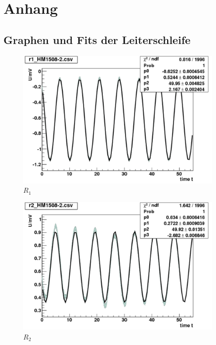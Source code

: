 \clearpage
\section{Anhang}

\begin{appendix}

\section{Graphen und Fits der Leiterschleife}

\begin{figure}[H]
	\centering \includegraphics[width=0.9\textwidth]{Auswertung/Widerstaende/r1.pdf}
	\caption{$R_1$}
\end{figure}

\begin{figure}[H]
	\centering \includegraphics[width=0.9\textwidth]{Auswertung/Widerstaende/r2.pdf}
	\caption{$R_2$}
\end{figure}


\end{appendix}
